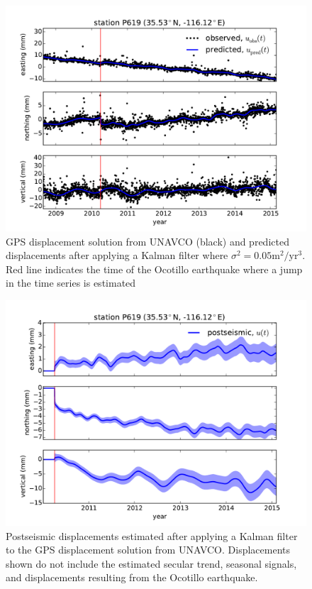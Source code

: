 \documentclass[12pt]{article}
\begin{document}
\begin{figure}
\includegraphics[scale=0.6]{Figures/figure_3}
\centering
\caption{GPS displacement solution from UNAVCO (black) and predicted displacements after applying a Kalman filter where $\sigma^2=0.05 \mathrm{m}^2/\mathrm{yr}^3$. Red line indicates the time of the Ocotillo earthquake where a jump in the time series is estimated}
\label{fig:P619Fit}
\end{figure}

\begin{figure}

\includegraphics[scale=0.6]{Figures/figure_4}
\centering
\caption{Postseismic displacements estimated after applying a Kalman filter to the GPS displacement solution from UNAVCO.  Displacements shown do not include the estimated secular trend, seasonal signals, and displacements resulting from the Ocotillo earthquake.} 
\label{fig:P619PS}
\end{figure}
\end{document}
